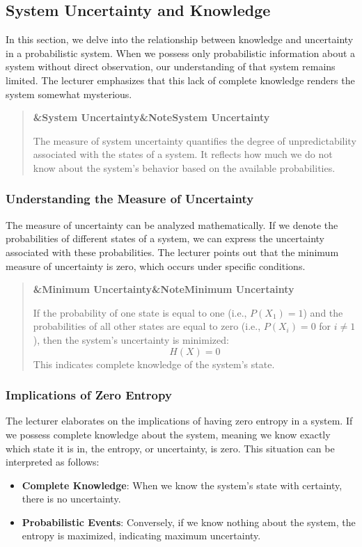 \documentclass[a4paper]{article}
\newcommand{\boxheading}[1]{%
  \par\smallskip
  \noindent\textbf{\ifx&#1&Note\else#1\fi}\par
  \smallskip
}
\newenvironment{thmbox}[1][]{%
  \begin{quote}\color{blue!60!black}\boxheading{#1}\normalcolor
}{\end{quote}}
\newenvironment{defbox}[1][]{%
  \begin{quote}\color{green!40!black}\boxheading{#1}\normalcolor
}{\end{quote}}
\begin{document}
\subsection{System Uncertainty and Knowledge}
In this section, we delve into the relationship between knowledge and uncertainty in a probabilistic system. When we possess only probabilistic information about a system without direct observation, our understanding of that system remains limited. The lecturer emphasizes that this lack of complete knowledge renders the system somewhat mysterious.

\begin{defbox}[System Uncertainty]
The measure of system uncertainty quantifies the degree of unpredictability associated with the states of a system. It reflects how much we do not know about the system's behavior based on the available probabilities.
\end{defbox}

\subsubsection{Understanding the Measure of Uncertainty}
The measure of uncertainty can be analyzed mathematically. If we denote the probabilities of different states of a system, we can express the uncertainty associated with these probabilities. The lecturer points out that the minimum measure of uncertainty is zero, which occurs under specific conditions.

\begin{thmbox}[Minimum Uncertainty]
If the probability of one state is equal to one (i.e., \( P(X_1) = 1 \)) and the probabilities of all other states are equal to zero (i.e., \( P(X_i) = 0 \) for \( i \neq 1 \)), then the system's uncertainty is minimized:
\[
H(X) = 0
\]
This indicates complete knowledge of the system's state.
\end{thmbox}

\subsubsection{Implications of Zero Entropy}
The lecturer elaborates on the implications of having zero entropy in a system. If we possess complete knowledge about the system, meaning we know exactly which state it is in, the entropy, or uncertainty, is zero. This situation can be interpreted as follows:

\begin{itemize}
    \item \textbf{Complete Knowledge}: When we know the system's state with certainty, there is no uncertainty.
    \item \textbf{Probabilistic Events}: Conversely, if we know nothing about the system, the entropy is maximized, indicating maximum uncertainty.
\end{itemize}
\end{document}
